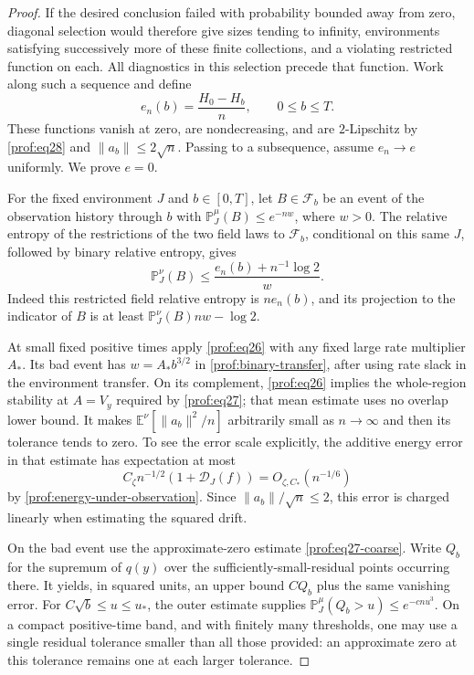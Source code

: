 \begin{proof}
If the desired conclusion failed with probability bounded away
from zero, diagonal selection would therefore give sizes tending
to infinity, environments satisfying successively more of these
finite collections, and a violating restricted function on each.
All diagnostics in this selection precede that function. Work
along such a sequence and define
\[
 e_n(b)=\frac{H_0-H_b}{n},\qquad 0\le b\le T.
\]
These functions vanish at zero, are nondecreasing, and are $2$-Lipschitz by
\eqref{prof:eq28} and $\|a_b\|\le2\sqrt n$.  Passing to a subsequence,
assume $e_n\to e$ uniformly.  We prove $e=0$.

For the fixed environment \(J\) and \(b\in[0,T]\), let
\(B\in\mathcal F_b\) be an event of the observation history through \(b\)
with \(\mathbb P_J^\mu(B)\le e^{-nw}\), where \(w>0\). The relative
entropy of the restrictions of the two field laws to \(\mathcal F_b\),
conditional on this same \(J\), followed by binary relative entropy, gives
\begin{equation}
 \mathbb P_J^\nu(B)
   \le\frac{e_n(b)+n^{-1}\log2}{w}.
 \label{prof:binary-transfer}
\end{equation}
Indeed this restricted field relative entropy is $ne_n(b)$, and its projection to the
indicator of $B$ is at least $\mathbb P_J^\nu(B)nw-\log2$.

At small fixed positive times apply \eqref{prof:eq26} with any fixed large
rate multiplier $A_*$.  Its bad event has $w=A_*b^{3/2}$ in
\eqref{prof:binary-transfer}, after using rate slack in the environment
transfer. On its complement, \eqref{prof:eq26} implies the
whole-region stability at \(A=V_y\) required by
\eqref{prof:eq27}; that mean estimate uses no overlap lower bound.
It makes
$\mathbb E^\nu[\|a_b\|^2/n]$ arbitrarily small as $n\to\infty$ and
then its tolerance tends to zero.  To see the error scale explicitly, the
additive energy error in that estimate has expectation at most
\[
 C_\zeta n^{-1/2}(1+\mathcal D_J(f))=O_{\zeta,C_*}(n^{-1/6})
\]
by \eqref{prof:energy-under-observation}.  Since
$\|a_b\|/\sqrt n\le2$, this error is charged linearly when estimating
the squared drift.

On the bad event use the approximate-zero estimate
\eqref{prof:eq27-coarse}.
Write $Q_b$ for the supremum of $q(y)$ over the sufficiently-small-residual
points occurring there.  It yields, in squared units, an upper bound
$CQ_b$ plus the same vanishing error. For
\(C\sqrt b\le u\le u_*\), the outer estimate supplies
\(\mathbb P_J^\mu(Q_b>u)\le e^{-cnu^3}\).
On a compact positive-time band, and with finitely many thresholds, one
may use a single residual tolerance smaller than all those provided:
an approximate zero at this tolerance remains one at each larger tolerance.


\end{proof}
